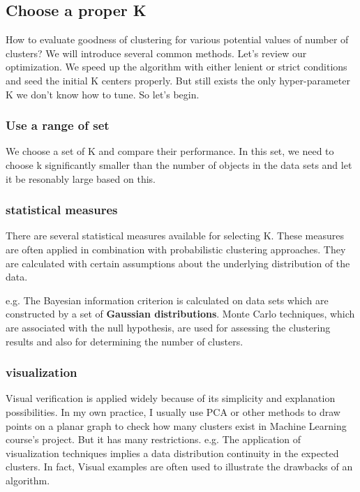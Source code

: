 \documentclass[11pt]{article}
\begin{document}
\subsection{Choose a proper K}
How to evaluate goodness of clustering for various potential values of number of clusters? We will introduce several common methods.\cite{datamining,inproceedings,articleToBound,doi:10.1243/095440605X8298} Let's review our optimization. We speed up the algorithm with either lenient or strict conditions and seed the initial K centers properly. But still exists the only hyper-parameter K we don't know how to tune. So let's begin. \par


\subsubsection{Use a range of set}
We choose a set of K and compare their performance. In this set, we need to choose k significantly smaller than the number of objects in the data sets and let it be resonably large based on this.

\subsubsection{statistical measures}
There are several statistical measures available for selecting K. These measures are often applied in combination with probabilistic clustering approaches.
They are calculated with certain assumptions about the underlying distribution of the data. \par
e.g. The Bayesian information criterion is calculated on data sets which are constructed by a set of \textbf{Gaussian distributions}. Monte Carlo techniques, which are associated with the null hypothesis, are used for assessing the clustering results and also for determining the number of clusters.

\subsubsection{visualization}
Visual verification is applied widely because of its simplicity and explanation possibilities. In my own practice, I usually use PCA or other methods to draw points on a planar graph to check how many clusters exist in Machine Learning course's project. But it has many restrictions. e.g. The application of
visualization techniques implies a data distribution continuity in the expected clusters. In fact, Visual examples are often used to illustrate the drawbacks of an algorithm. \par
\end{document}

